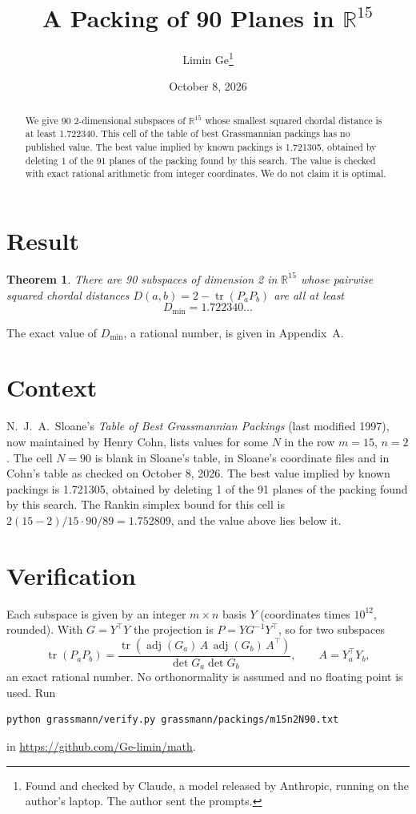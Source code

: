\documentclass[11pt,a4paper]{article}
\title{A Packing of 90 Planes in $\mathbb{R}^{15}$}
\author{Limin Ge\thanks{Found and checked by Claude, a model released by Anthropic, running on the author's laptop. The author sent the prompts.}}
\date{October 8, 2026}
\newtheorem*{theorem}{Theorem}
\begin{document}
\maketitle
\begin{abstract}
We give 90 2-dimensional subspaces of $\mathbb{R}^{15}$ whose smallest squared chordal distance is at least 1.722340. This cell of the table of best Grassmannian packings has no published value. The best value implied by known packings is 1.721305, obtained by deleting 1 of the 91 planes of the packing found by this search. The value is checked with exact rational arithmetic from integer coordinates. We do not claim it is optimal.
\end{abstract}

\section{Result}
\begin{theorem}
There are 90 subspaces of dimension 2 in $\mathbb{R}^{15}$ whose pairwise squared chordal distances $D(a,b) = 2 - \operatorname{tr}(P_aP_b)$ are all at least
\[ D_{\min} = 1.722340\ldots \]
\end{theorem}
The exact value of $D_{\min}$, a rational number, is given in Appendix~A.


\section{Context}
N.~J.~A.~Sloane's \emph{Table of Best Grassmannian Packings} (last modified 1997), now maintained by Henry Cohn, lists values for some $N$ in the row $m=15$, $n=2$. The cell $N=90$ is blank in Sloane's table, in Sloane's coordinate files and in Cohn's table as checked on October 8, 2026. The best value implied by known packings is 1.721305, obtained by deleting 1 of the 91 planes of the packing found by this search. The Rankin simplex bound for this cell is $2(15-2)/15\cdot 90/89 = 1.752809$, and the value above lies below it.


\section{Verification}
Each subspace is given by an integer $m\times n$ basis $Y$ (coordinates times $10^{12}$, rounded). With $G=Y^\top Y$ the projection is $P=YG^{-1}Y^\top$, so for two subspaces
\[ \operatorname{tr}(P_aP_b)=\frac{\operatorname{tr}(\operatorname{adj}(G_a)\,A\,\operatorname{adj}(G_b)\,A^\top)}{\det G_a\det G_b},\qquad A=Y_a^\top Y_b, \]
an exact rational number. No orthonormality is assumed and no floating point is used. Run
\begin{verbatim}
python grassmann/verify.py grassmann/packings/m15n2N90.txt
\end{verbatim}
in \url{https://github.com/Ge-limin/math}.
\end{document}
